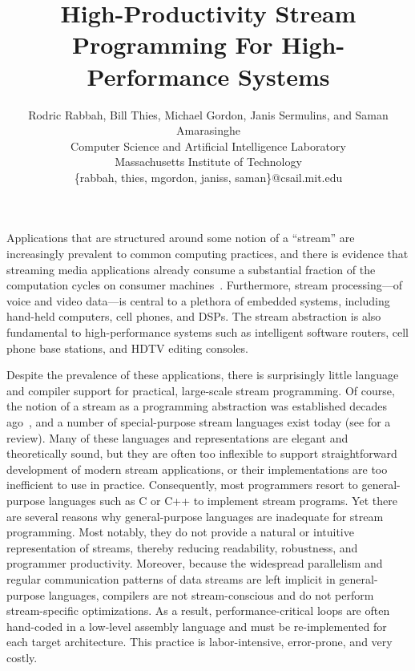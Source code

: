 \documentclass[times,10pt]{tr}
\title {\bf High-Productivity Stream Programming For High-Performance Systems}
\author{
  Rodric Rabbah, Bill Thies, Michael Gordon, Janis Sermulins, and Saman Amarasinghe\\
  Computer Science and Artificial Intelligence Laboratory\\
  Massachusetts Institute of Technology\\
  \{rabbah, thies, mgordon, janiss, saman\}@csail.mit.edu
}
\begin{document}
\maketitle


Applications that are structured around some notion of a ``stream''
are increasingly prevalent to common computing practices, and there is
evidence that streaming media applications already consume a
substantial fraction of the computation cycles on consumer
machines~\cite{rix98}. Furthermore, stream processing---of 
voice and video data---is central to a plethora of embedded
systems, including hand-held computers, cell phones, and DSPs. The
stream abstraction is also fundamental to high-performance systems
such as intelligent software routers, cell phone base stations, and
HDTV editing consoles.

Despite the prevalence of these applications, there is surprisingly
little language and compiler support for practical, large-scale stream
programming. Of course, the notion of a stream as a programming
abstraction was established decades ago~\cite{SICP}, and a number of
special-purpose stream languages exist today (see \cite{survey97} for
a review). Many of these languages and representations are elegant
and theoretically sound, but they are often too inflexible to support
straightforward development of modern stream applications, or their
implementations are too inefficient to use in practice. Consequently,
most programmers resort to general-purpose languages such as C or C++
to implement stream programs. Yet there are several reasons why
general-purpose languages are inadequate for stream programming. Most
notably, they do not provide a natural or intuitive representation of
streams, thereby reducing readability, robustness, and programmer
productivity. Moreover, because the widespread parallelism and
regular communication patterns of data streams are left implicit in
general-purpose languages, compilers are not stream-conscious and do
not perform stream-specific optimizations. As a result,
performance-critical loops are often hand-coded in a low-level
assembly language and must be re-implemented for each target
architecture. This practice is labor-intensive, error-prone, and very
costly.
\end{document}
